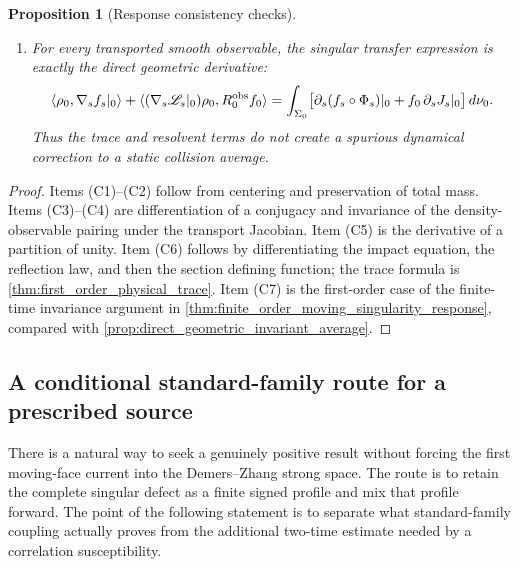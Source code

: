 \documentclass[11pt]{amsart}
\theoremstyle{compactplain}
\newtheorem*{proposition*}{Proposition}
\theoremstyle{compactdefinition}
\theoremstyle{compactremark}
\newcommand{\Ltransfer}{\mathscr L}
\begin{document}
\begin{proposition*}[Response consistency checks]
\begin{enumerate}[label=\textup{(C\arabic*)},wide,labelindent=0pt]
\begin{align}
      &\hspace{2em}\cdot\rho|_W(y)[\psi J_h]_{\Gamma_{i,h}}(y).
      \label{eq:rigid_translation_trace}
  \end{align}
  Inserting \(g_w\) into \eqref{eq:first_order_observable_response} gives the
  rigid-translation response.  In particular, a physical vector \(w\) is not
  identified directly with a normal vector in collision-section coordinates.
  \item For every transported smooth observable, the singular transfer
  expression is exactly the direct geometric derivative:
  \[
    \langle\rho_0,\nabla_sf_s|_0\rangle
    +\langle(\nabla_s\Ltransfer_s|_0)\rho_0,
      R_0^{\rm obs}f_0\rangle
    =\int_{\Sigma_0}
      \bigl[\partial_s(f_s\circ\Phi_s)|_0
      +f_0\,\partial_sJ_s|_0\bigr]\,d\nu_0.
  \]
  Thus the trace and resolvent terms do not create a spurious dynamical
  correction to a static collision average.
\end{enumerate}
\end{proposition*}

\begin{proof}
Items (C1)--(C2) follow from centering and preservation of total mass.
Items (C3)--(C4) are differentiation of a conjugacy and invariance of the
density-observable pairing under the transport Jacobian.  Item (C5) is the
derivative of a partition of unity.  Item (C6) follows by differentiating the
impact equation, the reflection law, and then the section defining function;
the trace formula is \cref{thm:first_order_physical_trace}.  Item (C7) is the
first-order case of the finite-time invariance argument in
\cref{thm:finite_order_moving_singularity_response}, compared with
\cref{prop:direct_geometric_invariant_average}.
\end{proof}

\subsection{A conditional standard-family route for a prescribed source}
\label{sec:conditional_standard_family_route}

There is a natural way to seek a genuinely positive result without forcing
the first moving-face current into the Demers--Zhang strong space.  The route
is to retain the complete singular defect as a finite signed profile and mix
that profile forward.  The point of the following statement is to separate
what standard-family coupling actually proves from the additional two-time
estimate needed by a correlation susceptibility.
\end{document}
